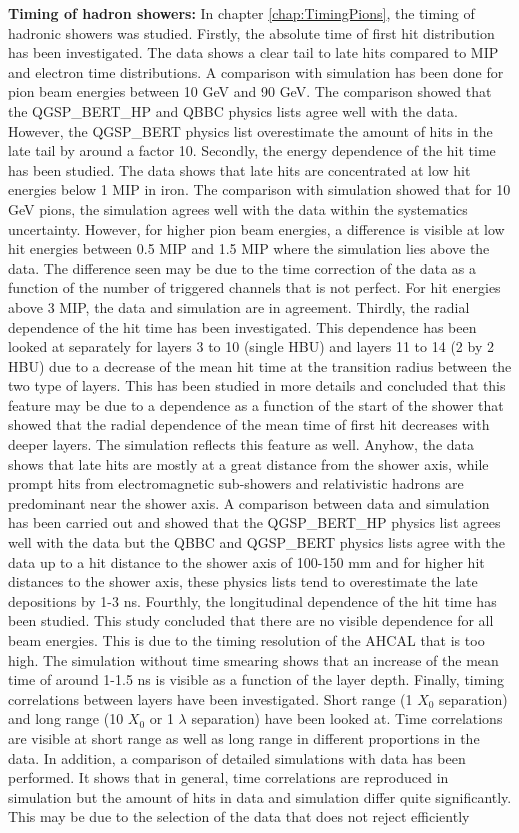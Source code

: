 \noindent\textbf{Timing of hadron showers:} In chapter \ref{chap:TimingPions}, the timing of hadronic showers was studied. Firstly, the absolute time of first hit distribution has been investigated. The data shows a clear tail to late hits compared to MIP and electron time distributions. A comparison with simulation has been done for pion beam energies between 10 GeV and 90 GeV. The comparison showed that the QGSP\_BERT\_HP and QBBC physics lists agree well with the data. However, the QGSP\_BERT physics list overestimate the amount of hits in the late tail by around a factor 10. Secondly, the energy dependence of the hit time has been studied. The data shows that late hits are concentrated at low hit energies below 1 MIP in iron. The comparison with simulation showed that for 10 GeV pions, the simulation agrees well with the data within the systematics uncertainty. However, for higher pion beam energies, a difference is visible at low hit energies between 0.5 MIP and 1.5 MIP where the simulation lies above the data. The difference seen may be due to the time correction of the data as a function of the number of triggered channels that is not perfect. For hit energies above 3 MIP, the data and simulation are in agreement. Thirdly, the radial dependence of the hit time has been investigated. This dependence has been looked at separately for layers 3 to 10 (single HBU) and layers 11 to 14 (2 by 2 HBU) due to a decrease of the mean hit time at the transition radius between the two type of layers. This has been studied in more details and concluded that this feature may be due to a dependence as a function of the start of the shower that showed that the radial dependence of the mean time of first hit decreases with deeper layers. The simulation reflects this feature as well. Anyhow, the data shows that late hits are mostly at a great distance from the shower axis, while prompt hits from electromagnetic sub-showers and relativistic hadrons are predominant near the shower axis. A comparison between data and simulation has been carried out and showed that the QGSP\_BERT\_HP physics list agrees well with the data but the QBBC and QGSP\_BERT physics lists agree with the data up to a hit distance to the shower axis of 100-150 mm and for higher hit distances to the shower axis, these physics lists tend to overestimate the late depositions by 1-3 ns. Fourthly, the longitudinal dependence of the hit time has been studied. This study concluded that there are no visible dependence for all beam energies. This is due to the timing resolution of the AHCAL that is too high. The simulation without time smearing shows that an increase of the mean time of around 1-1.5 ns is visible as a function of the layer depth. Finally, timing correlations between layers have been investigated. Short range (1 $X_0$ separation) and long range (10 $X_0$ or 1 $\lambda$ separation) have been looked at. Time correlations are visible at short range as well as long range in different proportions in the data. In addition, a comparison of detailed simulations with data has been performed. It shows that in general, time correlations are reproduced in simulation but the amount of hits in data and simulation differ quite significantly. This may be due to the selection of the data that does not reject efficiently 